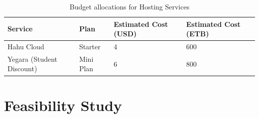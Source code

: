 \documentclass[12pt]{report}
\begin{document}
\begin{table}[H]
	\begin{center}
		\begin{tabular}{|p{3cm}|p{3cm}|p{2.5cm}|p{2.5cm}||}
			\hline
			\textbf{Service}          & \textbf{Plan} & \textbf{Estimated Cost (USD)} & \textbf{Estimated Cost (ETB)} \\
			\hline
			Hahu Cloud                & Starter       & 4                             & 600                           \\
			\hline
			Yegara (Student Discount) & Mini Plan     & 6                             & 800                           \\
			\hline
			\hline
		\end{tabular}
		\caption{Budget allocations for Hosting Services}\label{tab:table2}
	\end{center}
\end{table}

\section{Feasibility Study}
\end{document}
